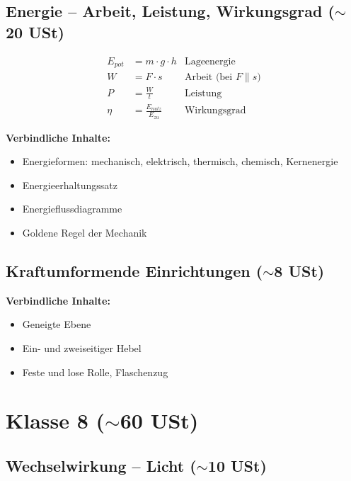 \documentclass[11pt,a4paper]{article}
\begin{document}
\subsection{Energie -- Arbeit, Leistung, Wirkungsgrad ($\sim$20 USt)}

\begin{formelbox}
\begin{align*}
E_{pot} &= m \cdot g \cdot h & \text{Lageenergie} \\
W &= F \cdot s & \text{Arbeit (bei $F \parallel s$)} \\
P &= \frac{W}{t} & \text{Leistung} \\
\eta &= \frac{E_{nutz}}{E_{zu}} & \text{Wirkungsgrad}
\end{align*}
\end{formelbox}

\textbf{Verbindliche Inhalte:}
\begin{itemize}[leftmargin=0.5cm, itemsep=1pt]
\item Energieformen: mechanisch, elektrisch, thermisch, chemisch, Kernenergie
\item Energieerhaltungssatz
\item Energieflussdiagramme
\item Goldene Regel der Mechanik
\end{itemize}

\subsection{Kraftumformende Einrichtungen ($\sim$8 USt)}

\textbf{Verbindliche Inhalte:}
\begin{itemize}[leftmargin=0.5cm, itemsep=1pt]
\item Geneigte Ebene
\item Ein- und zweiseitiger Hebel
\item Feste und lose Rolle, Flaschenzug
\end{itemize}

\newpage
\section{Klasse 8 ($\sim$60 USt)}

\subsection{Wechselwirkung -- Licht ($\sim$10 USt)}
\end{document}
